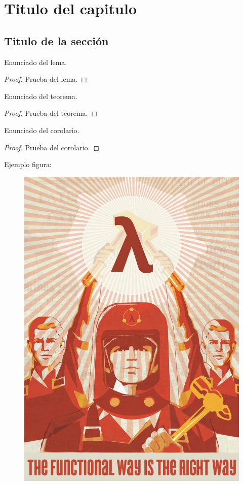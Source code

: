 \chapter{Titulo del capitulo}\label{cap1}

\section{Titulo de la sección}\label{cap1:sec1}

\begin{lemma}\label{lema1}
    Enunciado del lema.
\end{lemma}

\begin{proof}
    Prueba del lema.
\end{proof}

\begin{theorem}\label{teorema1}
    Enunciado del teorema.
\end{theorem}

\begin{proof}
    Prueba del teorema.
\end{proof}

\begin{corollary}\label{corolario1}
    Enunciado del corolario.
\end{corollary}

\begin{proof}
    Prueba del corolario.
\end{proof}

Ejemplo figura:

\begin{figure}[h] 
  \centering
  \includegraphics[width=1\textwidth]{Imgs/FunctionalWay.jpg}
\end{figure}
